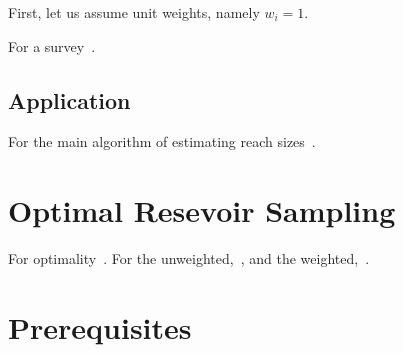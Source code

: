 \documentclass{article}
\begin{document}
First, let us assume unit weights, namely $w_i = 1$.

For a survey~\cite{cohen07-08}.

\subsection{Application}
For the main algorithm of estimating reach sizes~\cite{cohen97-12}.

\section{Optimal Resevoir Sampling}
\label{sec:resevoir}

For optimality~\cite{vitter85-03}.
For the unweighted,~\cite{li94-12}, and the weighted,~\cite{efraimidis06-03}.

\section{Prerequisites}
\label{sec:prereq}

\printbibliography
\end{document}
